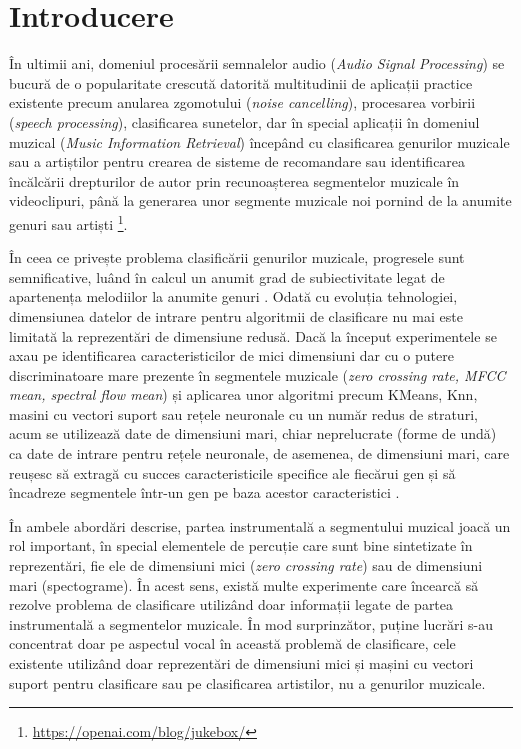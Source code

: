 \chapter{Introducere} 

În ultimii ani, domeniul procesării semnalelor audio (\textit{Audio Signal Processing}) se bucură de o popularitate crescută 
datorită multitudinii de aplicații practice existente precum anularea zgomotului (\textit{noise cancelling}), 
procesarea vorbirii (\textit{speech processing}), clasificarea sunetelor, dar în special aplicații în domeniul muzical 
(\textit{Music Information Retrieval}) începând cu clasificarea genurilor muzicale sau a artiștilor pentru crearea de sisteme 
de recomandare sau identificarea încălcării drepturilor de autor prin recunoașterea segmentelor muzicale în videoclipuri, 
până la generarea unor segmente muzicale noi pornind de la anumite genuri sau artiști \footnote{\url{https://openai.com/blog/jukebox/}}.

În ceea ce privește problema clasificării genurilor muzicale, progresele sunt semnificative, 
luând în calcul un anumit grad de 
subiectivitate legat de apartenența melodiilor la anumite genuri \cite{subjectivity}. 
Odată cu evoluția tehnologiei, dimensiunea datelor de intrare pentru algoritmii de clasificare nu mai este limitată la 
reprezentări de dimensiune redusă. Dacă la început experimentele se axau pe identificarea caracteristicilor de mici 
dimensiuni dar cu o putere discriminatoare mare prezente în segmentele muzicale (\textit{zero crossing rate, MFCC mean, 
spectral flow mean}\cite{featureselection}) și aplicarea unor algoritmi precum KMeans, Knn, masini cu vectori suport 
sau rețele neuronale cu un număr redus de straturi, 
acum se utilizează date de dimensiuni mari, chiar neprelucrate (forme de undă) ca date de intrare pentru rețele neuronale, 
de asemenea, de dimensiuni mari, care reușesc să extragă cu succes caracteristicile specifice ale fiecărui gen și 
să încadreze segmentele într-un gen pe baza acestor caracteristici \cite{resut1,resut2}.

În ambele abordări descrise, partea instrumentală a segmentului muzical joacă un rol important, 
în special elementele de percuție care sunt bine sintetizate în reprezentări, 
fie ele de dimensiuni mici (\textit{zero crossing rate}) sau de dimensiuni mari (spectograme). 
În acest sens, există multe experimente care încearcă să rezolve problema de clasificare utilizând doar 
informații legate de partea instrumentală a segmentelor muzicale\cite{instrumental}. 
În mod surprinzător, puține lucrări s-au concentrat doar pe aspectul vocal în această problemă de clasificare, 
cele existente utilizând doar reprezentări de dimensiuni mici și mașini cu vectori suport pentru clasificare\cite{vocal} sau
pe clasificarea artistilor, nu a genurilor muzicale\cite{artists}.

